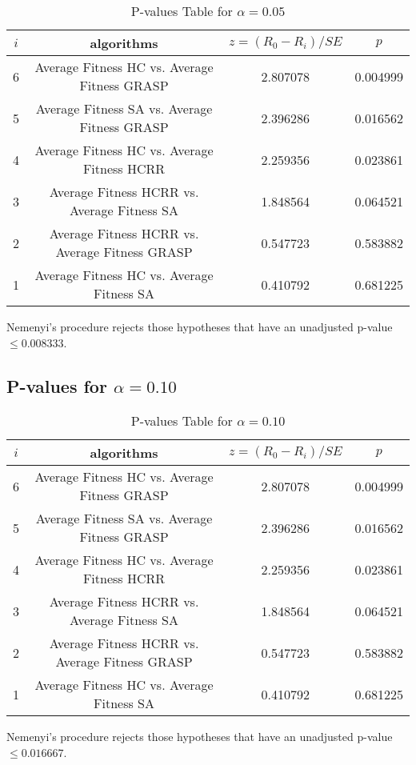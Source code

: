 \documentclass[a4paper,10pt]{article}
\begin{document}
\begin{landscape}
\begin{table}[!htp]
\centering\scriptsize
\begin{tabular}{cccc}
$i$&algorithms&$z=(R_0 - R_i)/SE$&$p$\\
\hline6&Average Fitness HC       vs. Average Fitness GRASP&2.807078&0.004999\\
5&Average Fitness SA      vs. Average Fitness GRASP&2.396286&0.016562\\
4&Average Fitness HC       vs. Average Fitness HCRR   &2.259356&0.023861\\
3&Average Fitness HCRR    vs. Average Fitness SA     &1.848564&0.064521\\
2&Average Fitness HCRR    vs. Average Fitness GRASP&0.547723&0.583882\\
1&Average Fitness HC       vs. Average Fitness SA     &0.410792&0.681225\\
\hline
\end{tabular}
\caption{P-values Table for $\alpha=0.05$}
\end{table}Nemenyi's procedure rejects those hypotheses that have an unadjusted p-value $\le0.008333$.

\pagebreak

\subsection{P-values for $\alpha=0.10$}

\begin{table}[!htp]
\centering\scriptsize
\begin{tabular}{cccc}
$i$&algorithms&$z=(R_0 - R_i)/SE$&$p$\\
\hline6&Average Fitness HC       vs. Average Fitness GRASP&2.807078&0.004999\\
5&Average Fitness SA      vs. Average Fitness GRASP&2.396286&0.016562\\
4&Average Fitness HC       vs. Average Fitness HCRR   &2.259356&0.023861\\
3&Average Fitness HCRR    vs. Average Fitness SA     &1.848564&0.064521\\
2&Average Fitness HCRR    vs. Average Fitness GRASP&0.547723&0.583882\\
1&Average Fitness HC       vs. Average Fitness SA     &0.410792&0.681225\\
\hline
\end{tabular}
\caption{P-values Table for $\alpha=0.10$}
\end{table}Nemenyi's procedure rejects those hypotheses that have an unadjusted p-value $\le0.016667$.


\end{landscape}
\end{document}
